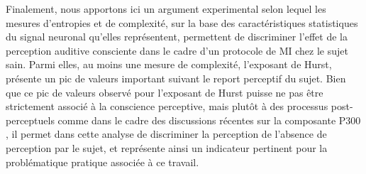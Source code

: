 Finalement, nous apportons ici un argument experimental selon lequel les mesures d'entropies et de complexité, sur la base des caractéristiques statistiques du signal neuronal qu'elles représentent, permettent de discriminer l'effet de la perception auditive consciente dans le cadre d'un protocole de MI chez le sujet sain. 
Parmi elles, au moins une mesure de complexité, l'exposant de Hurst, présente un pic de valeurs important suivant le report perceptif du sujet. 
Bien que ce pic de valeurs observé pour l'exposant de Hurst puisse ne pas être strictement associé à la conscience perceptive, mais plutôt à des processus post-perceptuels comme dans le cadre des discussions récentes sur la composante P300 \citep{cohen2020distinguishing, fishman2021learning, pitts2014gamma, pitts2014isolating, tsuchiya2015no}, il permet dans cette analyse de discriminer la perception de l'absence de perception par le sujet, et représente ainsi un indicateur pertinent pour la problématique pratique associée à ce travail. 


